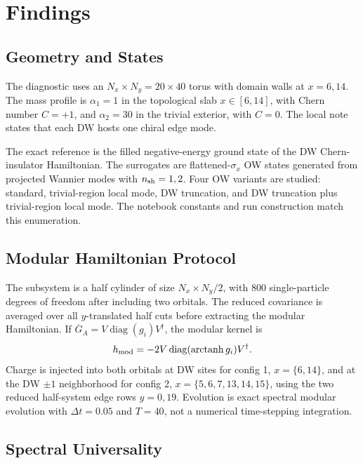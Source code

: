 \documentclass[aps,prb,onecolumn,nofootinbib,superscriptaddress]{revtex4-2}
\begin{document}
\section{Findings}

\subsection{Geometry and States}

The diagnostic uses an \(N_x\times N_y=20\times 40\) torus with domain walls at \(x=6,14\).  The mass profile is \(\alpha_1=1\) in the topological slab \(x\in[6,14]\), with Chern number \(C=+1\), and \(\alpha_2=30\) in the trivial exterior, with \(C=0\).  The local note states that each DW hosts one chiral edge mode.

The exact reference is the filled negative-energy ground state of the DW Chern-insulator Hamiltonian.  The surrogates are flattened-\(\sigma_x\) OW states generated from projected Wannier modes with \(n_{\rm sh}=1,2\).  Four OW variants are studied: standard, trivial-region local mode, DW truncation, and DW truncation plus trivial-region local mode.  The notebook constants and run construction match this enumeration.

\subsection{Modular Hamiltonian Protocol}

The subsystem is a half cylinder of size \(N_x\times N_y/2\), with \(800\) single-particle degrees of freedom after including two orbitals.  The reduced covariance is averaged over all \(y\)-translated half cuts before extracting the modular Hamiltonian.  If \(\overline{G}_A=V\operatorname{diag}(g_i)V^\dagger\), the modular kernel is
\begin{equation}
h_{\rm mod}=-2V\operatorname{diag}(\operatorname{arctanh} g_i)V^\dagger .
\end{equation}
Charge is injected into both orbitals at DW sites for config 1, \(x=\{6,14\}\), and at the DW \(\pm1\) neighborhood for config 2, \(x=\{5,6,7,13,14,15\}\), using the two reduced half-system edge rows \(y=0,19\).  Evolution is exact spectral modular evolution with \(\Delta t=0.05\) and \(T=40\), not a numerical time-stepping integration.

\subsection{Spectral Universality}
\end{document}
